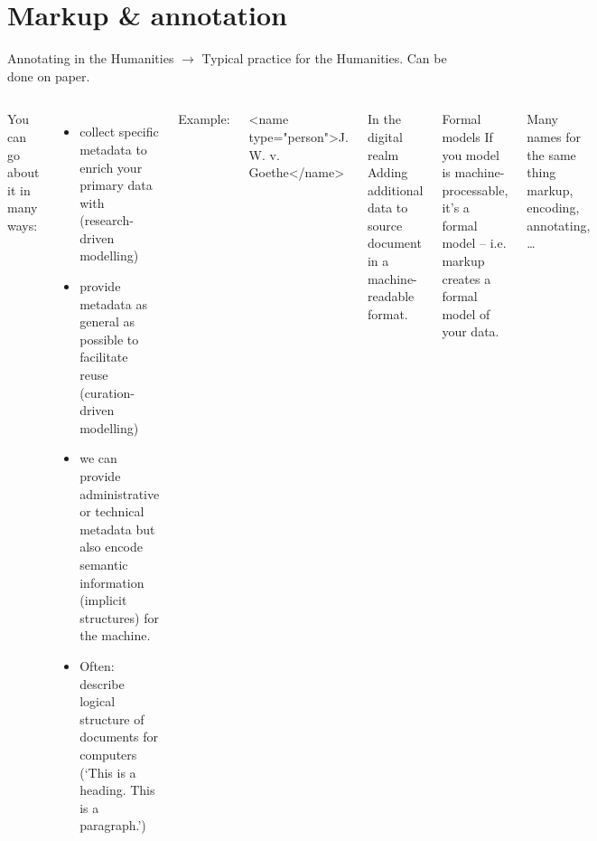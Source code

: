 
\section{Markup \& annotation}

\begin{frame}[fragile]{Annotating in the Humanities}
\small{}
$\to$ Typical practice for the Humanities. Can be done on paper.

\begin{columns}
You can go about it in many ways:
\begin{itemize}\footnotesize
\item collect specific metadata to enrich your primary data with (research-driven modelling)
\item provide metadata as general as possible to facilitate reuse (curation-driven modelling)
\item we can provide administrative or technical metadata but also encode semantic information (implicit structures) for the machine.
\item Often: describe logical structure of documents for computers (`This is a heading. This is a paragraph.')
\end{itemize}

Example: 
\begin{xmlcode}
<name type="person">J. W. v. Goethe</name>
\end{xmlcode}

\begin{block}{In the digital realm}\footnotesize
Adding additional data to source document in a machine-readable format.
\end{block} 
\begin{block}{Formal models}\footnotesize
If you model is machine-processable, it's a formal model -- i.e. markup creates a formal model of your data.
\end{block}

\begin{block}{Many names for the same thing}
\footnotesize
markup, encoding, annotating, \dots
\end{block}
\end{columns}

\end{frame}

